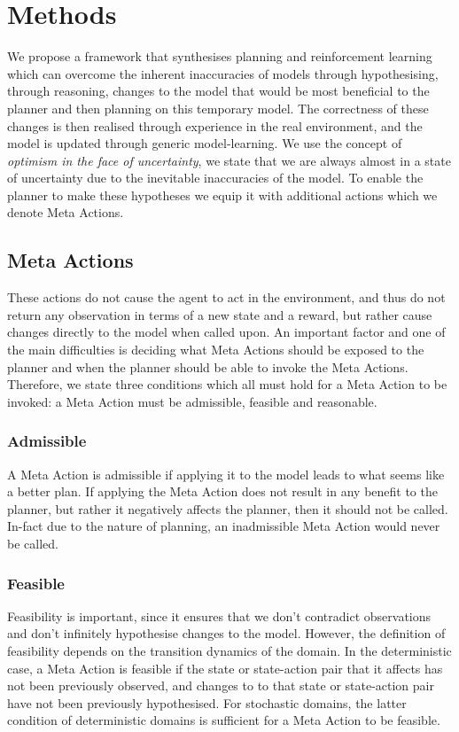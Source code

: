 \chapter{Methods}
\label{chapter4}

We propose a framework that synthesises planning and reinforcement learning which can overcome the inherent inaccuracies of models through hypothesising, through reasoning, changes to the model that would be most beneficial to the planner and then planning on this temporary model. The correctness of these changes is then realised through experience in the real environment, and the model is updated through generic model-learning.
We use the concept of \textit{optimism in the face of uncertainty}, we state that we are always almost in a state of uncertainty due to the inevitable inaccuracies of the model.
To enable the planner to make these hypotheses we equip it with additional actions which we denote Meta Actions.
\section{Meta Actions}
These actions do not cause the agent to act in the environment, and thus do not return any observation in terms of a new state and a reward, but rather cause changes directly to the model when called upon. An important factor and one of the main difficulties is deciding what Meta Actions should be exposed to the planner and when the planner should be able to invoke the Meta Actions. Therefore, we state three conditions which all must hold for a Meta Action to be invoked: a Meta Action must be admissible, feasible and reasonable.
\subsection{Admissible}
A Meta Action is admissible if applying it to the model leads to what seems like a better plan. If applying the Meta Action does not result in any benefit to the planner, but rather it negatively affects the planner, then it should not be called. In-fact due to the nature of planning, an inadmissible Meta Action would never be called.
\subsection{Feasible}
Feasibility is important, since it ensures that we don't contradict observations and don't infinitely hypothesise changes to the model. However, the definition of feasibility depends on the transition dynamics of the domain. In the deterministic case, a Meta Action is feasible if the state or state-action pair that it affects has not been previously observed, and changes to to that state or state-action pair have not been previously hypothesised.
For stochastic domains, the latter condition of deterministic domains is sufficient for a Meta Action to be feasible.
